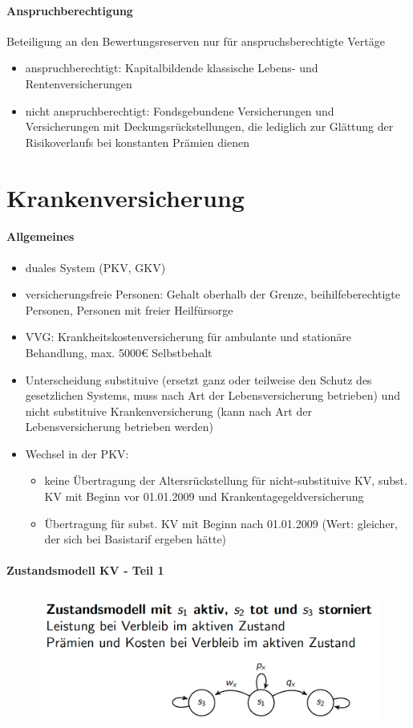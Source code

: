 \documentclass[12pt]{report}
\theoremstyle{dotless}
\theoremstyle{definition}
\begin{document}
\subsubsection{Anspruchberechtigung}
Beteiligung an den Bewertungsreserven nur für anspruchsberechtigte Vertäge
\begin{itemize}
\item anspruchberechtigt: Kapitalbildende klassische Lebens- und Rentenversicherungen
\item nicht anspruchberechtigt: Fondsgebundene Versicherungen und Versicherungen mit Deckungsrückstellungen, die lediglich zur Glättung der Risikoverlaufs bei konstanten Prämien dienen
\end{itemize}

\chapter{Krankenversicherung}

\subsubsection{Allgemeines}
\begin{itemize}
	\item duales System (PKV, GKV)
	\item versicherungsfreie Personen: Gehalt oberhalb der Grenze, beihilfeberechtigte Personen, Personen mit freier Heilfürsorge
	\item VVG: Krankheitskostenversicherung für ambulante und stationäre Behandlung, max. 5000€ Selbstbehalt
	\item Unterscheidung substituive (ersetzt ganz oder teilweise den Schutz des gesetzlichen Systems, muss nach Art der Lebensversicherung betrieben) und nicht substituive Krankenversicherung (kann nach Art der Lebensversicherung betrieben werden)
	\item Wechsel in der PKV: 
		\begin{itemize}
		\item keine Übertragung der Altersrückstellung für nicht-substituive KV, subst. KV mit Beginn vor 01.01.2009 und Krankentagegeldversicherung
		\item Übertragung für subst. KV mit Beginn nach 01.01.2009 (Wert: gleicher, der sich bei Basistarif ergeben hätte)
		\end{itemize}
\end{itemize}

\subsubsection{Zustandsmodell KV - Teil 1}
\begin{figure}[ht]
	\centering
	\includegraphics[width = .8\textwidth]{Bilder/ZustandModellKV.png}
\end{figure}
\end{document}
